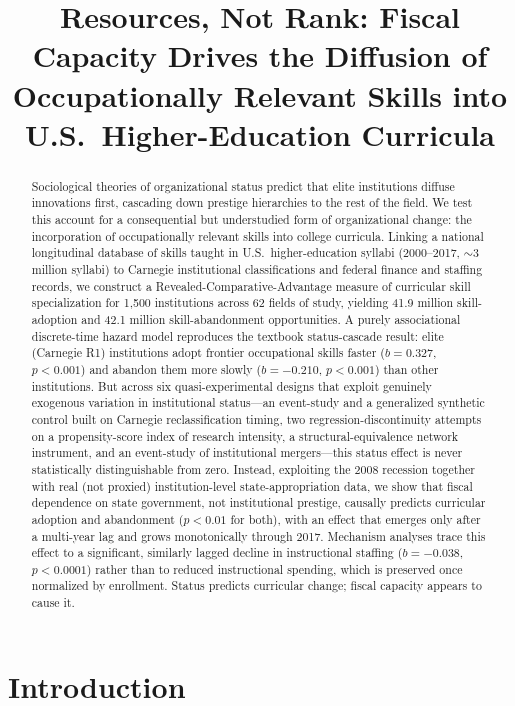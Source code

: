 \documentclass[11pt, letterpaper]{article}
\title{\textbf{Resources, Not Rank: Fiscal Capacity Drives the Diffusion of Occupationally Relevant Skills into U.S.\ Higher-Education Curricula}}
\author{}
\date{}
\begin{document}
\maketitle

\begin{abstract}
Sociological theories of organizational status predict that elite institutions diffuse innovations first, cascading down prestige hierarchies to the rest of the field. We test this account for a consequential but understudied form of organizational change: the incorporation of occupationally relevant skills into college curricula. Linking a national longitudinal database of skills taught in U.S.\ higher-education syllabi (2000--2017, $\sim$3 million syllabi) to Carnegie institutional classifications and federal finance and staffing records, we construct a Revealed-Comparative-Advantage measure of curricular skill specialization for 1,500 institutions across 62 fields of study, yielding 41.9 million skill-adoption and 42.1 million skill-abandonment opportunities. A purely associational discrete-time hazard model reproduces the textbook status-cascade result: elite (Carnegie R1) institutions adopt frontier occupational skills faster ($b=0.327$, $p<0.001$) and abandon them more slowly ($b=-0.210$, $p<0.001$) than other institutions. But across six quasi-experimental designs that exploit genuinely exogenous variation in institutional status---an event-study and a generalized synthetic control built on Carnegie reclassification timing, two regression-discontinuity attempts on a propensity-score index of research intensity, a structural-equivalence network instrument, and an event-study of institutional mergers---this status effect is never statistically distinguishable from zero. Instead, exploiting the 2008 recession together with real (not proxied) institution-level state-appropriation data, we show that fiscal dependence on state government, not institutional prestige, causally predicts curricular adoption and abandonment ($p<0.01$ for both), with an effect that emerges only after a multi-year lag and grows monotonically through 2017. Mechanism analyses trace this effect to a significant, similarly lagged decline in instructional staffing ($b=-0.038$, $p<0.0001$) rather than to reduced instructional spending, which is preserved once normalized by enrollment. Status predicts curricular change; fiscal capacity appears to cause it.
\end{abstract}

\clearpage
\section*{Introduction}
\end{document}
